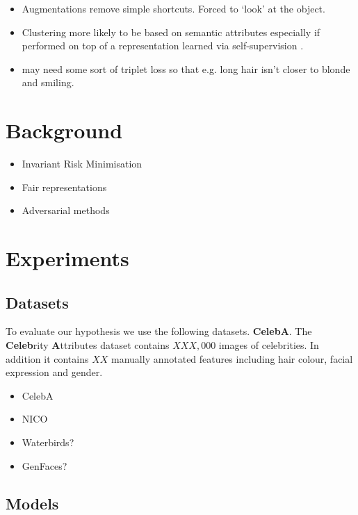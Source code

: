 \documentclass[sigconf,anonymous,review]{acmart}
\begin{document}
\begin{itemize}
    \item Augmentations remove simple shortcuts. Forced to `look' at the object.
    \item Clustering more likely to be based on semantic attributes especially if performed on top of a representation learned via self-supervision \citep{van2020scan}.
    \item may need some sort of triplet loss so that e.g. long hair isn't closer to blonde and smiling.
\end{itemize}

\section{Background}
\label{sec:background}

\begin{itemize}
    \item Invariant Risk Minimisation
    \item Fair representations
    \item Adversarial methods
\end{itemize}

\balance %
\section{Experiments}
\label{sec:experiments}

\subsection{Datasets}
\label{sec:datasets}
To evaluate our hypothesis we use the following datasets.
\textbf{CelebA}. The \textbf{Celeb}rity \textbf{A}ttributes dataset contains $XXX,000$ images of celebrities.
In addition it contains $XX$ manually annotated features including hair colour, facial expression and gender.

\begin{itemize}
    \item CelebA
    \item NICO
    \item Waterbirds?
    \item GenFaces?
\end{itemize}

\subsection{Models}
\label{sec:models}
\end{document}
